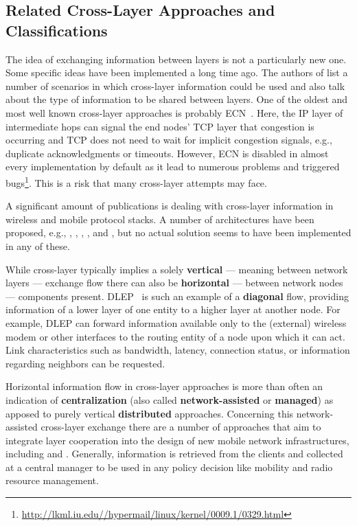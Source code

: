 \subsection{Related Cross-Layer Approaches and Classifications}

The idea of exchanging information between layers is not a particularly new one. Some specific ideas have been implemented a long time ago. The authors of \cite{Raisinghani2004720} list a number of scenarios in which cross-layer information could be used and also talk about the type of information to be shared between layers. One of the oldest and most well known cross-layer approaches is probably \gls{ECN}~\cite{rfc3168}. Here, the \gls{IP} layer of intermediate hops can signal the end nodes' \gls{TCP} layer that congestion is occurring and \gls{TCP} does not need to wait for implicit congestion signals, e.g., duplicate acknowledgments or timeouts. However, \gls{ECN} is disabled in almost every implementation by default as it lead to numerous problems and triggered bugs\footnote{\url{http://lkml.iu.edu//hypermail/linux/kernel/0009.1/0329.html}}. This is a risk that many cross-layer attempts may face.

A significant amount of publications is dealing with cross-layer information in wireless and mobile protocol stacks. A number of architectures have been proposed, e.g., \cite{raisinghani2004eclair}, \cite{1580937}, \cite{wang2003multi}, \cite{1200522}, and \cite{krishna2007cross}, but no actual solution seems to have been implemented in any of these.

While cross-layer typically implies a solely \textbf{vertical} --- meaning between network layers --- exchange flow there can also be \textbf{horizontal} --- between network nodes --- components present. \gls{DLEP}~\cite{ietf2013dlepdraft,6379143} is such an example of a \textbf{diagonal} flow, providing information of a lower layer of one entity to a higher layer at another node. For example, \gls{DLEP} can forward information available only to the (external) wireless modem or other interfaces to the routing entity of a node upon which it can act. Link characteristics such as bandwidth, latency, connection status, or information regarding neighbors can be requested.

Horizontal information flow in cross-layer approaches is more than often an indication of \textbf{centralization} (also called \textbf{network-assisted} or \textbf{managed}) as apposed to purely vertical \textbf{distributed} approaches. Concerning this network-assisted cross-layer exchange there are a number of approaches that aim to integrate layer cooperation into the design of new mobile network infrastructures, including \cite{zarai2010seamless} and \cite{Piamrat20111066}. Generally, information is retrieved from the clients and collected at a central manager to be used in any policy decision like mobility and radio resource management.

